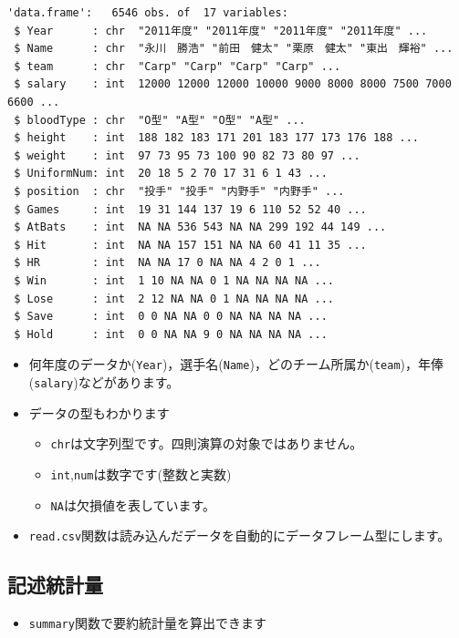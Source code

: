 \documentclass[
  a4paper,
]{ltjsbook}
\providecommand{\tightlist}{%
  \setlength{\itemsep}{0pt}\setlength{\parskip}{0pt}}\usepackage{longtable,booktabs,array}
\begin{document}
\begin{verbatim}
'data.frame':   6546 obs. of  17 variables:
 $ Year      : chr  "2011年度" "2011年度" "2011年度" "2011年度" ...
 $ Name      : chr  "永川　勝浩" "前田　健太" "栗原　健太" "東出　輝裕" ...
 $ team      : chr  "Carp" "Carp" "Carp" "Carp" ...
 $ salary    : int  12000 12000 12000 10000 9000 8000 8000 7500 7000 6600 ...
 $ bloodType : chr  "O型" "A型" "O型" "A型" ...
 $ height    : int  188 182 183 171 201 183 177 173 176 188 ...
 $ weight    : int  97 73 95 73 100 90 82 73 80 97 ...
 $ UniformNum: int  20 18 5 2 70 17 31 6 1 43 ...
 $ position  : chr  "投手" "投手" "内野手" "内野手" ...
 $ Games     : int  19 31 144 137 19 6 110 52 52 40 ...
 $ AtBats    : int  NA NA 536 543 NA NA 299 192 44 149 ...
 $ Hit       : int  NA NA 157 151 NA NA 60 41 11 35 ...
 $ HR        : int  NA NA 17 0 NA NA 4 2 0 1 ...
 $ Win       : int  1 10 NA NA 0 1 NA NA NA NA ...
 $ Lose      : int  2 12 NA NA 0 1 NA NA NA NA ...
 $ Save      : int  0 0 NA NA 0 0 NA NA NA NA ...
 $ Hold      : int  0 0 NA NA 9 0 NA NA NA NA ...
\end{verbatim}

\begin{itemize}
\tightlist
\item
  何年度のデータか(\texttt{Year})，選手名(\texttt{Name})，どのチーム所属か(\texttt{team})，年俸(\texttt{salary})などがあります。
\item
  データの型もわかります

  \begin{itemize}
  \tightlist
  \item
    \texttt{chr}は文字列型です。四則演算の対象ではありません。
  \item
    \texttt{int},\texttt{num}は数字です(整数と実数)
  \item
    \texttt{NA}は欠損値を表しています。
  \end{itemize}
\item
  \texttt{read.csv}関数は読み込んだデータを自動的にデータフレーム型にします。
\end{itemize}

\subsection{記述統計量}\label{ux8a18ux8ff0ux7d71ux8a08ux91cf}

\begin{itemize}
\tightlist
\item
  \texttt{summary}関数で要約統計量を算出できます
\end{itemize}
\end{document}
